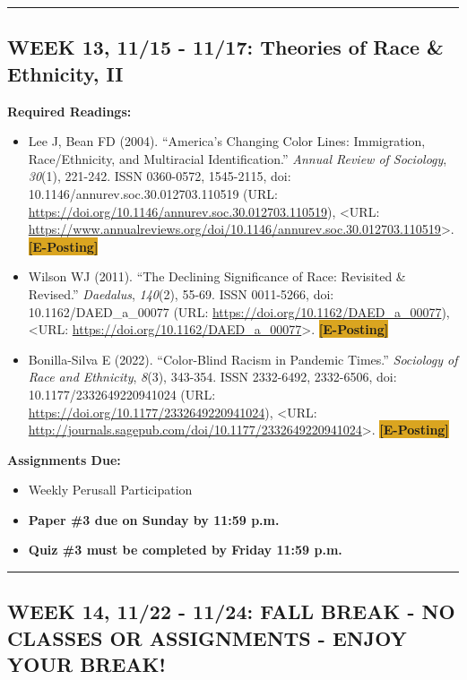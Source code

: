 \documentclass[11pt,]{article}
\providecommand{\tightlist}{%
  \setlength{\itemsep}{0pt}\setlength{\parskip}{0pt}}
\begin{document}
\bigbreak
\hrule

\hypertarget{week-13-1115---1117-theories-of-race-ethnicity-ii}{%
\subsection{WEEK 13, 11/15 - 11/17: Theories of Race \& Ethnicity,
II}\label{week-13-1115---1117-theories-of-race-ethnicity-ii}}

\textbf{Required Readings:}

\begin{itemize}
\item
  Lee J, Bean FD (2004). ``America's Changing Color Lines: Immigration,
  Race/Ethnicity, and Multiracial Identification.'' \emph{Annual Review
  of Sociology}, \emph{30}(1), 221-242. ISSN 0360-0572, 1545-2115, doi:
  10.1146/annurev.soc.30.012703.110519 (URL:
  \url{https://doi.org/10.1146/annurev.soc.30.012703.110519}),
  \textless URL:
  \url{https://www.annualreviews.org/doi/10.1146/annurev.soc.30.012703.110519}\textgreater.
  \colorbox{Goldenrod}{\bf{[E-Posting]}}
\item
  Wilson WJ (2011). ``The Declining Significance of Race: Revisited \&
  Revised.'' \emph{Daedalus}, \emph{140}(2), 55-69. ISSN 0011-5266, doi:
  10.1162/DAED\_a\_00077 (URL:
  \url{https://doi.org/10.1162/DAED_a_00077}), \textless URL:
  \url{https://doi.org/10.1162/DAED_a_00077}\textgreater.
  \colorbox{Goldenrod}{\bf{[E-Posting]}}
\item
  Bonilla-Silva E (2022). ``Color-Blind Racism in Pandemic Times.''
  \emph{Sociology of Race and Ethnicity}, \emph{8}(3), 343-354. ISSN
  2332-6492, 2332-6506, doi: 10.1177/2332649220941024 (URL:
  \url{https://doi.org/10.1177/2332649220941024}), \textless URL:
  \url{http://journals.sagepub.com/doi/10.1177/2332649220941024}\textgreater.
  \colorbox{Goldenrod}{\bf{[E-Posting]}}
\end{itemize}

\textbf{Assignments Due:}

\begin{itemize}
\tightlist
\item
  Weekly Perusall Participation
\item
  \textbf{Paper \#3 due on Sunday by 11:59 p.m.}
\item
  \textbf{Quiz \#3 must be completed by Friday 11:59 p.m.}
\end{itemize}

\bigbreak
\hrule

\hypertarget{week-14-1122---1124-fall-break---no-classes-or-assignments---enjoy-your-break}{%
\subsection{WEEK 14, 11/22 - 11/24: FALL BREAK - NO CLASSES OR
ASSIGNMENTS - ENJOY YOUR
BREAK!}\label{week-14-1122---1124-fall-break---no-classes-or-assignments---enjoy-your-break}}
\end{document}
